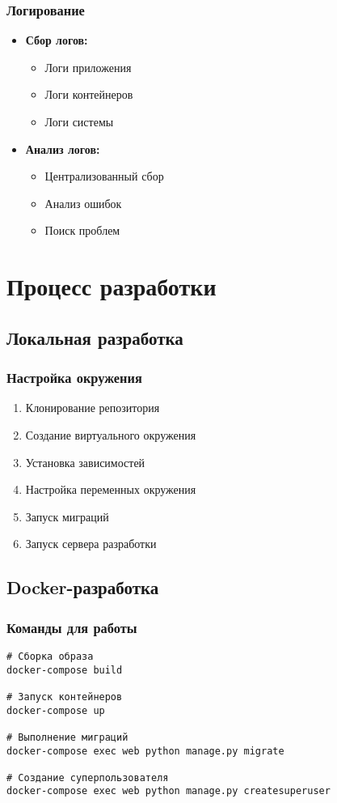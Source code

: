 \documentclass[12pt,a4paper]{article}
\begin{document}
\subsubsection{Логирование}
\begin{itemize}
    \item \textbf{Сбор логов:}
    \begin{itemize}
        \item Логи приложения
        \item Логи контейнеров
        \item Логи системы
    \end{itemize}
    \item \textbf{Анализ логов:}
    \begin{itemize}
        \item Централизованный сбор
        \item Анализ ошибок
        \item Поиск проблем
    \end{itemize}
\end{itemize}

\section{Процесс разработки}
\subsection{Локальная разработка}
\subsubsection{Настройка окружения}
\begin{enumerate}
    \item Клонирование репозитория
    \item Создание виртуального окружения
    \item Установка зависимостей
    \item Настройка переменных окружения
    \item Запуск миграций
    \item Запуск сервера разработки
\end{enumerate}

\subsection{Docker-разработка}
\subsubsection{Команды для работы}
\begin{verbatim}
# Сборка образа
docker-compose build

# Запуск контейнеров
docker-compose up

# Выполнение миграций
docker-compose exec web python manage.py migrate

# Создание суперпользователя
docker-compose exec web python manage.py createsuperuser
\end{verbatim}
\end{document}
